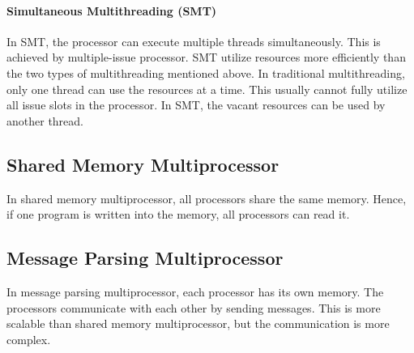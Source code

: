 \documentclass[a4paper,12pt]{article}
\begin{document}
\paragraph{Simultaneous Multithreading (SMT)} In SMT, the processor can execute multiple threads simultaneously. This is achieved by multiple-issue processor. SMT utilize resources more efficiently than the two types of multithreading mentioned above. In traditional multithreading, only one thread can use the resources at a time. This usually cannot fully utilize all issue slots in the processor. In SMT, the vacant resources can be used by another thread.

\subsection{Shared Memory Multiprocessor}

In shared memory multiprocessor, all processors share the same memory. Hence, if one program is written into the memory, all processors can read it. 

\subsection{Message Parsing Multiprocessor}

In message parsing multiprocessor, each processor has its own memory. The processors communicate with each other by sending messages. This is more scalable than shared memory multiprocessor, but the communication is more complex.
\end{document}
